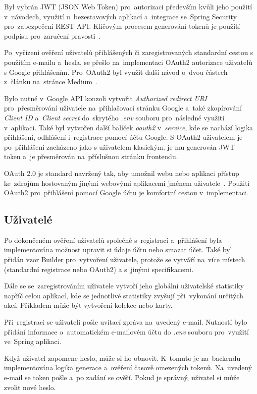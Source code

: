 \documentclass[twoside]{ctuthesis}
\begin{document}
Byl vybrán JWT (JSON Web Token) pro~autorizaci především kvůli jeho použití v~návodech, využití u~bezestavových aplikací a~integrace se~Spring Security pro~zabezpečení REST API. Klíčovým procesem generování tokenů je použití podpisu pro~zaručení pravosti~\cite{baeldungspring}.

Po~vyřízení ověření uživatelů přihlášených či zaregistrovaných standardní cestou s použitím e-mailu a~hesla, se přešlo na~implementaci OAuth2 autorizace uživatelů s Google přihlášením. Pro~OAuth2 byl využit další návod o~dvou částech z~článku na~stránce Medium~\cite{oauth1, oauth2}.

Bylo nutné v~Google API konzoli vytvořit \emph{Authorized redirect URI} pro~přesměrování uživatele na~přihlašovací stránku Google a~také zkopírování \emph{Client ID} a~\emph{Client secret} do~skrytého \emph{.env} souboru pro~následné využití v~aplikaci. Také byl vytvořen další balíček \emph{oauth2} v~\emph{service}, kde se nachází logika přihlášení, odhlášení i~registrace pomocí účtu Google. S OAuth2 uživatelem je po~přihlášení zacházeno jako s uživatelem klasickým, je mu generován JWT token a~je přesměrován na~příslušnou stránku frontendu.

OAuth 2.0 je standard navržený tak, aby umožnil webu nebo aplikaci přístup ke~zdrojům hostovaným jinými webovými aplikacemi jménem uživatele~\cite{oauth1}. Použití OAuth2 pro~přihlášení pomocí Google účtu je komfortní cestou v~implementaci.

\subsection{Uživatelé}

Po dokončeném ověření uživatelů společně s~registrací a~přihlášení byla implementována možnost upravit si údaje účtu nebo smazat účet. Také byl přidán vzor Builder pro~vytvoření uživatele, protože se vytváří na~více místech (standardní registrace nebo OAuth2) a s~jinými specifikacemi.

Dále se se~zaregistrováním uživatele vytvoří jeho globální uživatelské statistiky napříč celou aplikací, kde se jednotlivé statistiky zvyšují při~vykonání určitých akcí. Příkladem může být vytvoření kolekce nebo karty. 

Při~registraci se uživateli pošle uvítací zpráva na~uvedený e-mail. Nutností bylo přidání informace o~automatickém e-mailovém účtu do \emph{.env} souboru pro~využití ve~Spring aplikaci.

Když uživatel zapomene heslo, může si ho obnovit. K~tomuto je na~backendu implementována logika generace a~ověření časově omezených tokenů. Na~uvedený e-mail se token pošle a~po zadání se ověří. Pokud je správný, uživatel si může zvolit nové heslo.
\end{document}

